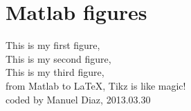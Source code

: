 \documentclass{article}
\begin{document}
\section{Matlab figures}

This is my first figure, \\
 

This is my second figure, \\
%

This is my third figure, \\


from Matlab to \LaTeX, Tikz is like magic! \\
coded by Manuel Diaz, 2013.03.30
\end{document}
